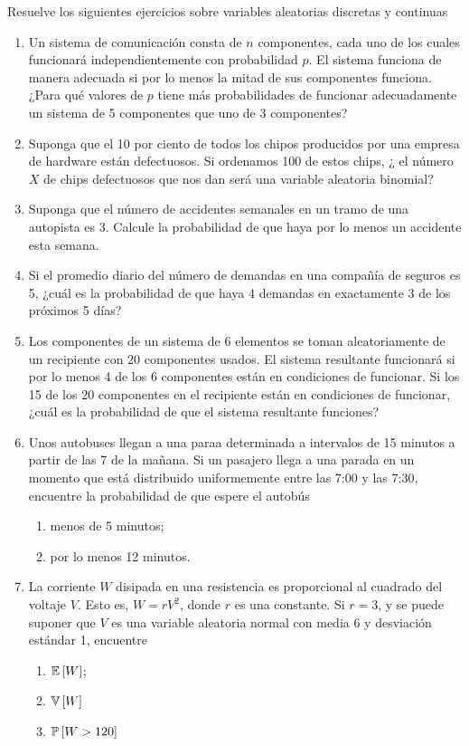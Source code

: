 \begin{Ejer} Resuelve los siguientes ejercicios sobre variables aleatorias discretas y continuas

\begin{enumerate}
\item Un sistema de comunicación consta de $n$ componentes, cada uno de los cuales funcionará independientemente con probabilidad $p$. El sistema funciona de manera adecuada si por lo menos la mitad de sus componentes funciona. ¿Para qué valores de $p$ tiene más probabilidades de funcionar adecuadamente un sistema de 5 componentes que uno de 3 componentes?

\item Suponga que el 10 por ciento de todos los chipos producidos por una empresa de hardware están defectuosos. Si ordenamos 100 de estos chips, ¿ el número $X$ de chips defectuosos que nos dan será una variable aleatoria binomial?

\item Suponga que el número de accidentes semanales en un tramo de una autopista es $3$. Calcule la probabilidad de que haya por lo menos un accidente esta semana.

\item Si el promedio diario del número de demandas en una compañía de seguros es 5, ¿cuál es la probabilidad de que haya 4 demandas en exactamente 3 de los próximos 5 días?

\item Los componentes de un sistema de 6 elementos se toman aleatoriamente de un recipiente con 20 componentes usados. El sistema resultante funcionará si por lo menos 4 de los 6 componentes están en condiciones de funcionar. Si los 15 de los 20 componentes en el recipiente están en condiciones de funcionar, ¿cuál es la probabilidad de que el sistema resultante funciones?

\item Unos autobuses llegan a una paraa determinada a intervalos de 15 minutos a partir de las 7 de la mañana. Si un pasajero llega a una parada en un momento que está distribuido uniformemente entre las 7:00 y las 7:30, encuentre la probabilidad de que espere el autobús
\begin{enumerate}
\item menos de 5 minutos;
\item por lo menos 12 minutos.
\end{enumerate}

\item La corriente $W$ disipada en una resistencia es proporcional al cuadrado del voltaje $V$. Esto es, $W=rV^{2}$, donde $r$ es una constante. Si $r=3$, y se puede suponer que $V$ es una variable aleatoria normal con media 6 y desviación estándar 1, encuentre
\begin{enumerate}
\item $\mathbb{E}\left[W\right]$;
\item $\mathbb{V}\left[W\right]$
\item $\mathbb{P}\left[W>120\right]$
\end{enumerate}


\end{enumerate}
\end{Ejer}
